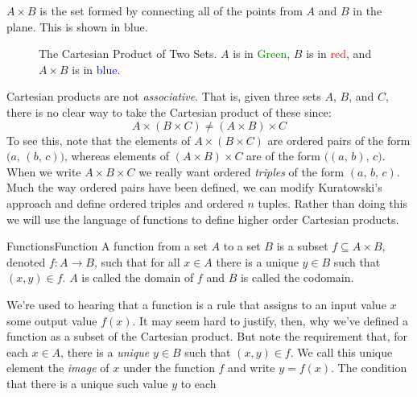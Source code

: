         $A\times{B}$ is the set formed by connecting all of the points
        from $A$ and $B$ in the plane. This is shown in blue.
        \begin{figure}[H]
            \centering
            
            \caption[Cartesian Product of Two Sets]
                {The Cartesian Product of Two Sets. $A$ is
                 in \textcolor{green}{Green},
                 $B$ is in \textcolor{red}{red}, and
                 $A\times{B}$ is in \textcolor{blue}{blue}.}
            \label{fig:Cartesian_Product_Example}
        \end{figure}
        Cartesian products are not \textit{associative}. That is, given three
        sets $A$, $B$, and $C$, there is no clear way to take the Cartesian
        product of these since:
        \begin{equation}
            A\times(B\times{C})\ne(A\times{B})\times{C}
        \end{equation}
        To see this, note that the elements of $A\times(B\times{C})$ are
        ordered pairs of the form $\big(a,\,(b,\,c)\big)$, whereas elements of
        $(A\times{B})\times{C}$ are of the form $\big((a,\,b),\,c\big)$. When
        we write $A\times{B}\times{C}$ we really want ordered \textit{triples}
        of the form $(a,\,b,\,c)$. Much the way ordered pairs have been
        defined, we can modify Kuratowski's approach and define ordered
        triples and ordered $n$ tuples. Rather than doing this we will use the
        language of functions to define higher order Cartesian products.
        \begin{fdefinition}{Functions}{Function}
            A function from a set $A$ to a set $B$ is a subset
            $f\subseteq{A}\times{B}$, denoted $f:A\rightarrow{B}$, such that
            for all $x\in{A}$ there is a unique $y\in{B}$ such that
            $(x,y)\in{f}$. $A$ is called the domain of $f$
            and $B$ is called the codomain.
        \end{fdefinition}
        We're used to hearing that a function is a rule that assigns to an
        input value $x$ some output value $f(x)$. It may seem hard to justify,
        then, why we've defined a function as a subset of the Cartesian
        product. But note the requirement that, for each $x\in{A}$, there is a
        \textit{unique} $y\in{B}$ such that $(x,y)\in{f}$. We call this unique
        element the \textit{image} of $x$ under the function $f$ and write
        $y=f(x)$. The condition that there is a unique such value $y$ to each
